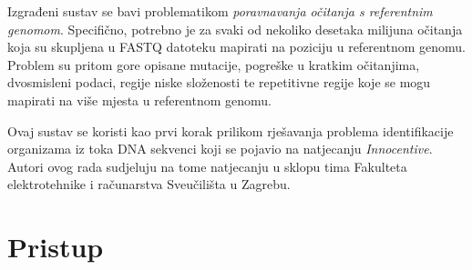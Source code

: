 \documentclass[times, utf8, diplomski]{fer}
\begin{document}
Izgrađeni sustav se bavi problematikom \emph{poravnavanja očitanja s referentnim genomom}. Specifično, potrebno
je za svaki od nekoliko desetaka milijuna očitanja koja su skupljena u FASTQ datoteku mapirati na poziciju u
referentnom genomu. Problem su pritom gore opisane mutacije, pogreške u kratkim očitanjima, dvosmisleni podaci,
regije niske složenosti te repetitivne regije koje se mogu mapirati na više mjesta u referentnom genomu.

Ovaj sustav se koristi kao prvi korak prilikom rješavanja problema identifikacije organizama iz toka DNA sekvenci
koji se pojavio na natjecanju \emph{Innocentive}. Autori ovog rada sudjeluju
na tome natjecanju u sklopu tima Fakulteta elektrotehnike i računarstva Sveučilišta u Zagrebu.




\chapter{Pristup}
\end{document}
